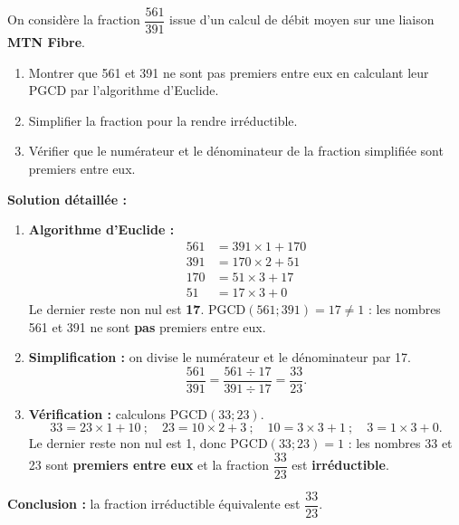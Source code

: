 \documentclass[11pt]{article}
\begin{document}
\begin{exoresolu}
On considère la fraction $\dfrac{561}{391}$ issue d'un calcul de débit moyen sur une liaison \textbf{MTN Fibre}.
\begin{enumerate}
    \item Montrer que 561 et 391 ne sont pas premiers entre eux en calculant leur PGCD par l'algorithme d'Euclide.
    \item Simplifier la fraction pour la rendre irréductible.
    \item Vérifier que le numérateur et le dénominateur de la fraction simplifiée sont premiers entre eux.
\end{enumerate}
\tcblower
\textbf{Solution détaillée :}
\begin{enumerate}
    \item \textbf{Algorithme d'Euclide :}
    \begin{align*}
    561 &= 391 \times 1 + 170 \\
    391 &= 170 \times 2 + 51 \\
    170 &= 51 \times 3 + 17 \\
    51 &= 17 \times 3 + 0
    \end{align*}
    Le dernier reste non nul est \textbf{17}.
    $\text{PGCD}(561; 391) = 17 \neq 1$ : les nombres 561 et 391 ne sont \textbf{pas} premiers entre eux.
    \item \textbf{Simplification :} on divise le numérateur et le dénominateur par 17.
    \[ \frac{561}{391} = \frac{561 \div 17}{391 \div 17} = \frac{33}{23}. \]
    \item \textbf{Vérification :} calculons $\text{PGCD}(33; 23)$.
    \[ 33 = 23 \times 1 + 10 \ ;\quad 23 = 10 \times 2 + 3 \ ;\quad 10 = 3 \times 3 + 1 \ ;\quad 3 = 1 \times 3 + 0. \]
    Le dernier reste non nul est 1, donc $\text{PGCD}(33; 23) = 1$ : les nombres 33 et 23 sont \textbf{premiers entre eux} et la fraction $\dfrac{33}{23}$ est \textbf{irréductible}.
\end{enumerate}
\textbf{Conclusion :} la fraction irréductible équivalente est $\dfrac{33}{23}$.
\end{exoresolu}
\end{document}
